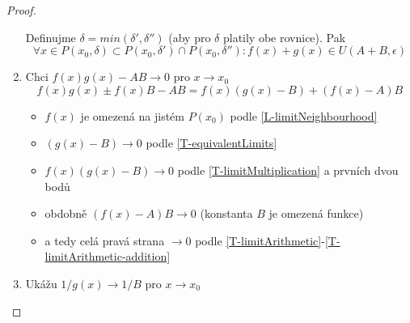 \begin{proof}
\begin{enumerate}
            Definujme $\delta=min(\delta',\delta'')$ (aby pro $\delta$ platily obe rovnice). Pak
            \begin{equation}
                \forall x\in P(x_0,\delta)\subset P(x_0,\delta')\cap P(x_0,\delta''):
                    f(x)+g(x)\in U(A+B,\epsilon)
            \end{equation}
        \item Chci $f(x)g(x)-AB\rightarrow 0$ pro $x\rightarrow x_0$
            \begin{equation}
                f(x)g(x)\pm f(x)B-AB = f(x)(g(x)-B) + (f(x)-A)B
            \end{equation}
            \begin{itemize}
                \item $f(x)$ je omezená na jistém $P(x_0)$ podle \autoref{L-limitNeighbourhood}
                \item $(g(x)-B)\rightarrow 0$ podle \autoref{T-equivalentLimits}
                \item $f(x)(g(x)-B)\rightarrow 0$ podle \autoref{T-limitMultiplication}
                    a prvních dvou bodů
                \item obdobně $(f(x)-A)B\rightarrow 0$ (konstanta $B$ je omezená funkce)
                \item a tedy celá pravá strana $\rightarrow 0$ podle
                    \autoref*{T-limitArithmetic}-\autoref{T-limitArithmetic-addition}
            \end{itemize}
        \item Ukážu $1/g(x)\rightarrow 1/B$ pro $x\rightarrow x_0$
    \end{enumerate}
\end{proof}
